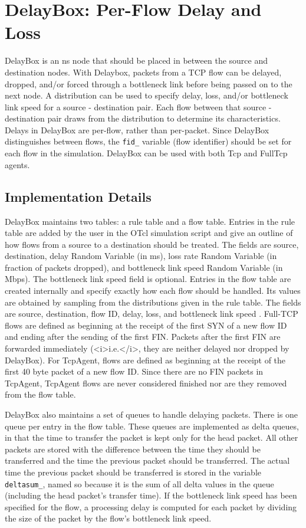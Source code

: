 \chapter{DelayBox: Per-Flow Delay and Loss}
\label{chap:delaybox}

DelayBox is an ns node that should be placed in between the source and
destination nodes. With Delaybox, packets from a TCP flow can be
delayed, dropped, and/or forced through a bottleneck link before being
passed on to the next node. A distribution can be used to specify
delay, loss, and/or bottleneck link speed for a source - destination
pair.  Each flow between that source - destination pair draws from the
distribution to determine its characteristics. Delays in DelayBox are
per-flow, rather than per-packet. Since DelayBox distinguishes between
flows, the {\tt fid\_} variable (flow identifier) should be set for
each flow in the simulation.  DelayBox can be used with both Tcp and
FullTcp agents.


\section{Implementation Details}

DelayBox maintains  two tables: a rule table and a flow table.  Entries
in the rule table are added by the user in the OTcl simulation script
and give an outline of how flows from a source to a destination should
be treated.  The fields are source, destination, delay Random Variable
(in ms), loss rate Random Variable (in fraction of packets dropped),
and bottleneck link speed Random Variable (in Mbps).  The bottleneck
link speed field is optional.  Entries in the flow table are created
internally and specify exactly how each flow should be handled.  Its
values are obtained by sampling from the distributions given in the
rule table.  The fields are source, destination, flow ID, delay, loss,
and bottleneck link speed .  Full-TCP flows are defined
as beginning at the receipt of the first SYN of a new flow ID and
ending after the sending of the first FIN.  Packets after the first
FIN are forwarded immediately (<i>i.e.</i>, they are neither delayed
nor dropped by DelayBox). For TcpAgent, flows are defined as beginning
at the receipt of the first 40 byte packet of a new flow ID.  Since
there are no FIN packets in TcpAgent, TcpAgent flows are never
considered finished nor are they removed from the flow table.

DelayBox also maintains a set of queues to handle delaying packets.
There is one queue per entry in the flow table.  These queues are
implemented as delta queues, in that the time to transfer the packet
is kept only for the head packet.  All other packets are stored with
the difference between the time they should be transferred and the
time the previous packet should be transferred.  The actual time the
previous packet should be transferred is stored in the variable {\tt
  deltasum\_}, named so because it is the sum of all delta values in
the queue (including the head packet's transfer time).  If the
bottleneck link speed has been specified for the flow, a processing
delay is computed for each packet by dividing the size of the packet
by the flow's bottleneck link speed.

